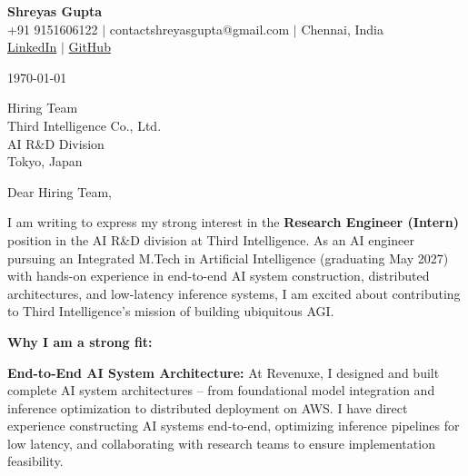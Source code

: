 \documentclass[11pt,letterpaper]{article}
\begin{document}
\begin{center}
    \textbf{\Large Shreyas Gupta} \\
    \vspace{4pt}
    +91 9151606122 $|$ contactshreyasgupta@gmail.com $|$ Chennai, India \\
    \href{https://linkedin.com/in/shreyasgupta}{LinkedIn} $|$ \href{https://github.com/shreyasgupta}{GitHub}
\end{center}

\vspace{14pt}

\noindent \today \\

\vspace{8pt}

\noindent Hiring Team \\
Third Intelligence Co., Ltd. \\
AI R\&D Division \\
Tokyo, Japan \\

\vspace{8pt}

\noindent Dear Hiring Team, \\

\vspace{6pt}

\noindent I am writing to express my strong interest in the \textbf{Research Engineer (Intern)} position in the AI R\&D division at Third Intelligence. As an AI engineer pursuing an Integrated M.Tech in Artificial Intelligence (graduating May 2027) with hands-on experience in end-to-end AI system construction, distributed architectures, and low-latency inference systems, I am excited about contributing to Third Intelligence's mission of building ubiquitous AGI.

\vspace{4pt}

\noindent \textbf{Why I am a strong fit:}

\vspace{4pt}

\noindent \textbf{End-to-End AI System Architecture:} At Revenuxe, I designed and built complete AI system architectures -- from foundational model integration and inference optimization to distributed deployment on AWS. I have direct experience constructing AI systems end-to-end, optimizing inference pipelines for low latency, and collaborating with research teams to ensure implementation feasibility.
\end{document}
